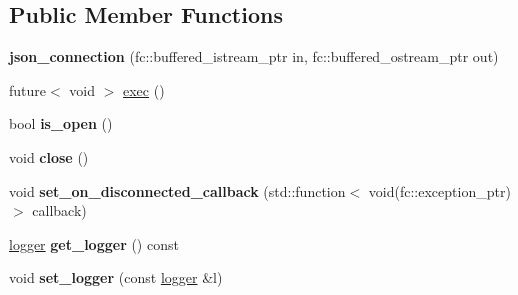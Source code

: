 \subsection*{Public Member Functions}
\begin{DoxyCompactItemize}
\item 
\mbox{\label{classfc_1_1rpc_1_1json__connection_acbf7d264033829acfa8dcd58733cb89b}} 
{\bfseries json\+\_\+connection} (fc\+::buffered\+\_\+istream\+\_\+ptr in, fc\+::buffered\+\_\+ostream\+\_\+ptr out)
\item 
future$<$ void $>$ \mbox{\hyperlink{classfc_1_1rpc_1_1json__connection_a5d74fbf566dd9bc5ac3e7bad92a6581a}{exec}} ()
\item 
\mbox{\label{classfc_1_1rpc_1_1json__connection_a8218177b0994b581678b19945bfedd99}} 
bool {\bfseries is\+\_\+open} ()
\item 
\mbox{\label{classfc_1_1rpc_1_1json__connection_ab074757f89f4bdf96701f08e5fcf3846}} 
void {\bfseries close} ()
\item 
\mbox{\label{classfc_1_1rpc_1_1json__connection_ab4909f89688d2f333d7b2d6d5549ecb0}} 
void {\bfseries set\+\_\+on\+\_\+disconnected\+\_\+callback} (std\+::function$<$ void(fc\+::exception\+\_\+ptr)$>$ callback)
\item 
\mbox{\label{classfc_1_1rpc_1_1json__connection_a32a348822547cb88f2e69b1f62852bcc}} 
\mbox{\hyperlink{classfc_1_1logger}{logger}} {\bfseries get\+\_\+logger} () const
\item 
\mbox{\label{classfc_1_1rpc_1_1json__connection_adca8a5c4931f1a70d1f3d2e58457e393}} 
void {\bfseries set\+\_\+logger} (const \mbox{\hyperlink{classfc_1_1logger}{logger}} \&l)
\end{DoxyCompactItemize}
